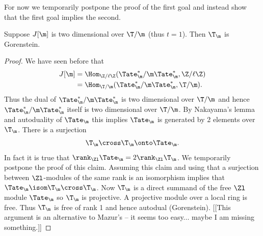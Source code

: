 \documentclass{report}
\begin{document}
For now we temporarily postpone the proof of the first goal and instead
show that the first goal implies the second.
\begin{theorem}
Suppose $J[\m]$ is two dimensional over $\T/\m$ (thus $t=1$). Then
$\T_\m$ is Gorenstein.
\end{theorem}
\begin{proof}
We have seen before that
\begin{align*}J[\m]&=\Hom_{\Z/\ell\Z}(\Tate^*_\m/\m\Tate^*_\m,\Z/\ell\Z)\\
                   &=\Hom_{\T/\m}(\Tate^*_\m/\m\Tate^*_\m,\T/\m).
\end{align*}
Thus the dual of $\Tate_\m^*/\m\Tate_\m^*$ is two dimensional over
$\T/\m$ and hence $\Tate_\m^*/\m\Tate_\m^*$ itself is two dimensional
over $\T/\m$. By Nakayama's lemma and autoduality of $\Tate_\m$
this implies $\Tate_\m$ is generated by 2 elements over $\T_\m$.
There is a surjection
$$\T_\m\cross\T_\m\onto\Tate_\m.$$
In fact it is true that $\rank_{\Zl}\Tate_\m=2\rank_{\Zl}\T_\m$. We
temporarily postpone the proof of this claim. Assuming this claim and
using that a surjection between $\Zl$-modules of the same rank
is an isomorphism implies that $\Tate_\m\isom\T_\m\cross\T_\m$.
Now $\T_\m$ is a direct summand of the free $\Zl$ module $\Tate_\m$
so $\T_\m$ is projective. A projective module over a local ring
is free. Thus $\T_\m$ is free of rank 1 and hence autodual (Gorenstein).
[[This argument is an alternative to Mazur's
-- it seems too easy... maybe I am missing something.]]


\end{proof}
\end{document}

